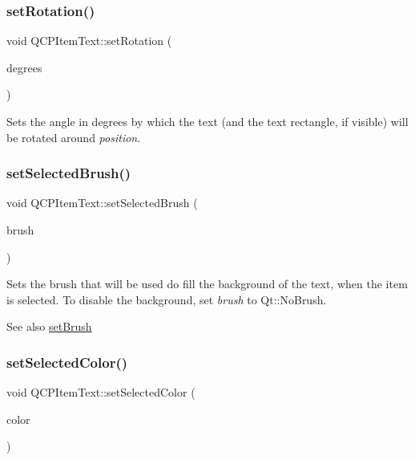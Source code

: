 \subsubsection{\texorpdfstring{set\+Rotation()}{setRotation()}}
{\footnotesize\ttfamily void Q\+C\+P\+Item\+Text\+::set\+Rotation (\begin{DoxyParamCaption}\item[{double}]{degrees }\end{DoxyParamCaption})}

Sets the angle in degrees by which the text (and the text rectangle, if visible) will be rotated around {\itshape position}. \mbox{\label{class_q_c_p_item_text_a6b8377eeb2af75eb9528422671ac16cb}} 
\subsubsection{\texorpdfstring{set\+Selected\+Brush()}{setSelectedBrush()}}
{\footnotesize\ttfamily void Q\+C\+P\+Item\+Text\+::set\+Selected\+Brush (\begin{DoxyParamCaption}\item[{const Q\+Brush \&}]{brush }\end{DoxyParamCaption})}

Sets the brush that will be used do fill the background of the text, when the item is selected. To disable the background, set {\itshape brush} to Qt\+::\+No\+Brush.

\begin{DoxySeeAlso}{See also}
\hyperlink{class_q_c_p_item_text_a1c7e131516df2ed8d941ef31240ded8e}{set\+Brush} 
\end{DoxySeeAlso}
\mbox{\label{class_q_c_p_item_text_ae7ba0bdb75c897b028388e45bfd435fa}} 
\subsubsection{\texorpdfstring{set\+Selected\+Color()}{setSelectedColor()}}
{\footnotesize\ttfamily void Q\+C\+P\+Item\+Text\+::set\+Selected\+Color (\begin{DoxyParamCaption}\item[{const Q\+Color \&}]{color }\end{DoxyParamCaption})}

